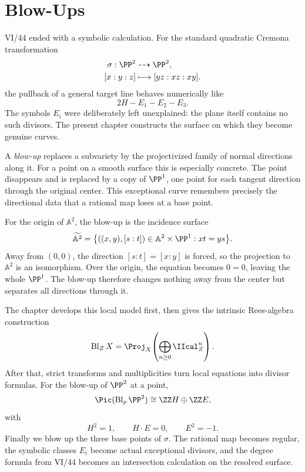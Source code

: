 \chapter{Blow-Ups}
\label{ch:vi45-blow-ups}
\providecommand{\Bl}{\operatorname{Bl}}
\providecommand{\Exc}{\operatorname{Exc}}
\providecommand{\mult}{\operatorname{mult}}
\providecommand{\ord}{\operatorname{ord}}

VI/44 ended with a symbolic calculation.  For the standard quadratic Cremona transformation
\[
  \begin{aligned}
  \sigma:\PP^2&\dashrightarrow\PP^2,\\
  [x:y:z]&\longmapsto[yz:xz:xy].
  \end{aligned}
\]
the pullback of a general target line behaves numerically like
\[
  2H-E_1-E_2-E_3.
\]
The symbols \(E_i\) were deliberately left unexplained: the plane itself contains no such divisors.  The present chapter constructs the surface on which they become genuine curves.

A \emph{blow-up} replaces a subvariety by the projectivized family of normal directions along it.  For a point on a smooth surface this is especially concrete.  The point disappears and is replaced by a copy of \(\PP^1\), one point for each tangent direction through the original center.  This exceptional curve remembers precisely the directional data that a rational map loses at a base point.

For the origin of \(\mathbb A^2\), the blow-up is the incidence surface
\[
  \widetilde{\mathbb A^2}
  =\bigl\{((x,y),[s:t])\in\mathbb A^2\times\PP^1:xt=ys\bigr\}.
\]
Away from \((0,0)\), the direction \([s:t]=[x:y]\) is forced, so the projection to \(\mathbb A^2\) is an isomorphism.  Over the origin, the equation becomes \(0=0\), leaving the whole \(\PP^1\).  The blow-up therefore changes nothing away from the center but separates all directions through it.

The chapter develops this local model first, then gives the intrinsic Rees-algebra construction
\[
  \Bl_ZX=\Proj_X\!\left(\bigoplus_{n\ge0}\IIcal_Z^n\right).
\]
After that, strict transforms and multiplicities turn local equations into divisor formulas.  For the blow-up of \(\PP^2\) at a point,
\[
  \Pic(\Bl_p\PP^2)\cong\ZZ H\oplus\ZZ E,
\]
with
\[
  H^2=1,\qquad H\cdot E=0,\qquad E^2=-1.
\]
Finally we blow up the three base points of \(\sigma\).  The rational map becomes regular, the symbolic classes \(E_i\) become actual exceptional divisors, and the degree formula from VI/44 becomes an intersection calculation on the resolved surface.

